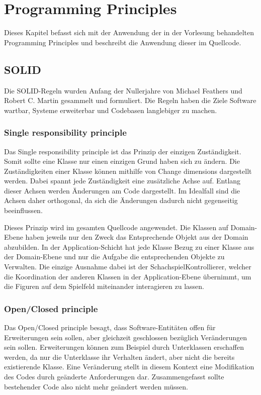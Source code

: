 \chapter{Programming Principles}
Dieses Kapitel befasst sich mit der Anwendung der in der Vorlesung behandelten Programming Principles und beschreibt die Anwendung dieser im Quellcode.

\section{SOLID}
Die SOLID-Regeln wurden Anfang der Nullerjahre von Michael Feathers und Robert C. Martin gesammelt und formuliert. Die Regeln haben die Ziele Software wartbar, Systeme erweiterbar und Codebasen langlebiger zu machen.

\subsection{Single responsibility principle}
Das Single responsibility principle ist das Prinzip der einzigen Zuständigkeit. Somit sollte eine Klasse nur einen einzigen Grund haben sich zu ändern. Die Zuständigkeiten einer Klasse können mithilfe von Change dimensions dargestellt werden. Dabei spannt jede Zuständigkeit eine zusätzliche Achse auf. Entlang dieser Achsen werden Änderungen am Code dargestellt. Im Idealfall sind die Achsen daher orthogonal, da sich die Änderungen dadurch nicht gegenseitig beeinflussen. 

Dieses Prinzip wird im gesamten Quellcode angewendet. Die Klassen auf Domain-Ebene haben jeweils nur den Zweck das Entsprechende Objekt aus der Domain abzubilden. In der Application-Schicht hat jede Klasse Bezug zu einer Klasse aus der Domain-Ebene und nur die Aufgabe die entsprechenden Objekte zu Verwalten. Die einzige Ausnahme dabei ist der SchachspielKontrollierer, welcher die Koordination der anderen Klassen in der Application-Ebene übernimmt, um die Figuren auf dem Spielfeld miteinander interagieren zu lassen.

\subsection{Open/Closed principle}
Das Open/Closed principle besagt, dass Software-Entitäten offen für Erweiterungen sein sollen, aber gleichzeit geschlossen bezüglich Veränderungen sein sollen. Erweiterungen können zum Beispiel durch Unterklassen erschaffen werden, da nur die Unterklasse ihr Verhalten ändert, aber nicht die bereits existierende Klasse. Eine Veränderung stellt in diesem Kontext eine Modifikation des Codes durch geänderte Anforderungen dar. Zusammengefasst sollte bestehender Code also nicht mehr geändert werden müssen.

